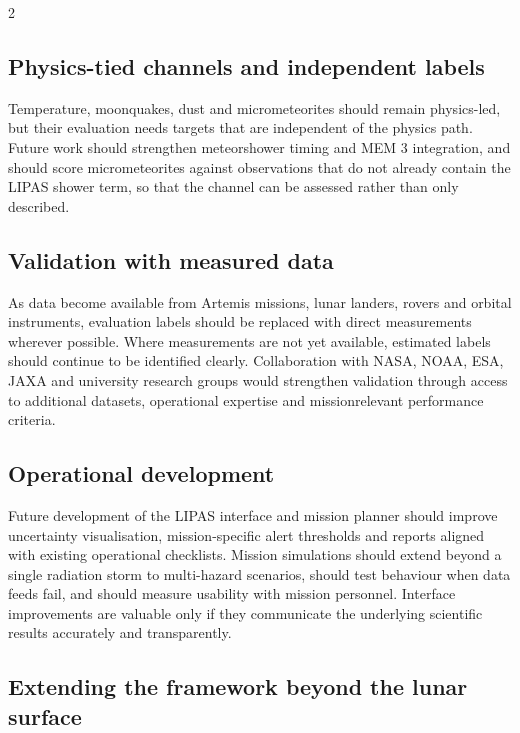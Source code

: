\begin{multicols}{2}
\subsection{Physics-tied channels and independent labels}

Temperature, moonquakes, dust and micrometeorites should remain physics-led, but their evaluation needs targets that are independent of the physics path. Future work should strengthen meteorshower timing and MEM 3 integration, and should score micrometeorites against observations that do not already contain the LIPAS shower term, so that the channel can be assessed rather than only described.

\subsection{Validation with measured data}

As data become available from Artemis missions, lunar landers, rovers and orbital instruments, evaluation labels should be replaced with direct measurements wherever possible. Where measurements are not yet available, estimated labels should continue to be identified clearly. Collaboration with NASA, NOAA, ESA, JAXA and university research groups would strengthen validation through access to additional datasets, operational expertise and missionrelevant performance criteria.

\subsection{Operational development}

Future development of the LIPAS interface and mission planner should improve uncertainty visualisation, mission-specific alert thresholds and reports aligned with existing operational checklists. Mission simulations should extend beyond a single radiation storm to multi-hazard scenarios, should test behaviour when data feeds fail, and should measure usability with mission personnel. Interface improvements are valuable only if they communicate the underlying scientific results accurately and transparently.

\subsection{Extending the framework beyond the lunar surface}


\end{multicols}

